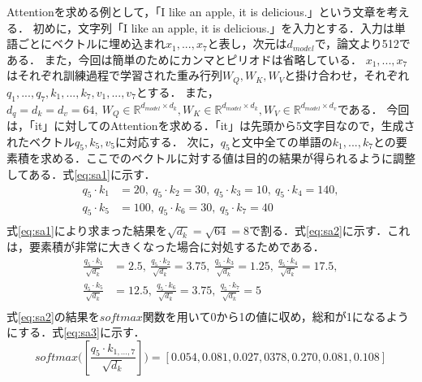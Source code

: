 \documentclass[a4paper, oneside, openany, dvipdfmx]{suribt}%
\newcommand{\eref}[1]{式\eqref{#1}}
\begin{document}
Attentionを求める例として，「I like an apple, it is delicious.」という文章を考える．
初めに，文字列「I like an apple, it is delicious.」を入力とする．入力は単語ごとにベクトルに埋め込まれ$x_{1},...,x_{7}$と表し，次元は$d_{model}$で，論文\cite{vaswani2017attention}より512である．
また，今回は簡単のためにカンマとピリオドは省略している．
$x_{1},...,x_{7}$はそれぞれ訓練過程で学習された重み行列$W_{Q},W_{K},W_{V}$と掛け合わせ，それぞれ$q_{1},...,q_{7}, k_{1},...,k_{7}, v_{1},...,v_{7}$とする．
また，$d_{q}=d_{k}=d_{v}=64,\ W_{Q}\in \mathbb{R}^{d_{model}\times d_{k}}, W_{K}\in \mathbb{R}^{d_{model}\times d_{k}},  W_{V}\in \mathbb{R}^{d_{model}\times d_{v}}$である．
今回は，「it」に対してのAttentionを求める．「it」は先頭から5文字目なので，生成されたベクトル$q_{5}, k_{5}, v_{5}$に対応する．
次に，$q_{5}$と文中全ての単語の$k_{1},...,k_{7}$との要素積を求める．ここでのベクトルに対する値は目的の結果が得られるように調整してある．\eref{eq:sa1}に示す．
\begin{equation}
  \begin{split}
    q_{5}\cdot k_{1} &=20,\ q_{5}\cdot k_{2}=30,\ q_{5}\cdot k_{3}=10,\ q_{5}\cdot k_{4}=140,\\
    q_{5}\cdot k_{5} &=100,\ q_{5}\cdot k_{6}=30,\ q_{5}\cdot k_{7}=40\\
  \end{split}
  \label{eq:sa1}
\end{equation}
\eref{eq:sa1}により求まった結果を$\sqrt{d_{k}}=\sqrt{64}=8$で割る．\eref{eq:sa2}に示す．これは，要素積が非常に大きくなった場合に対処するためである．
\begin{equation}
  \begin{split}
    \frac{q_{5}\cdot k_{1}}{\sqrt{d_{k}}} &=2.5,\ \frac{q_{5}\cdot k_{2}}{\sqrt{d_{k}}}=3.75,\ \frac{q_{5}\cdot k_{3}}{\sqrt{d_{k}}}=1.25,\ \frac{q_{5}\cdot k_{4}}{\sqrt{d_{k}}}=17.5,\\
    \frac{q_{5}\cdot k_{5}}{\sqrt{d_{k}}} &=12.5,\ \frac{q_{5}\cdot k_{6}}{\sqrt{d_{k}}}=3.75,\ \frac{q_{5}\cdot k_{7}}{\sqrt{d_{k}}}=5\\
  \end{split}
  \label{eq:sa2}
\end{equation}
\eref{eq:sa2}の結果を$softmax$関数を用いて0から1の値に収め，総和が1になるようにする．\eref{eq:sa3}に示す．
\begin{equation}
  softmax\bigr([\frac{q_{5}\cdot k_{1,...,7}}{\sqrt{d_{k}}}]\bigr) = [0.054,0.081,0.027,0378,0.270,0.081,0.108]
  \label{eq:sa3}
\end{equation}
\end{document}
